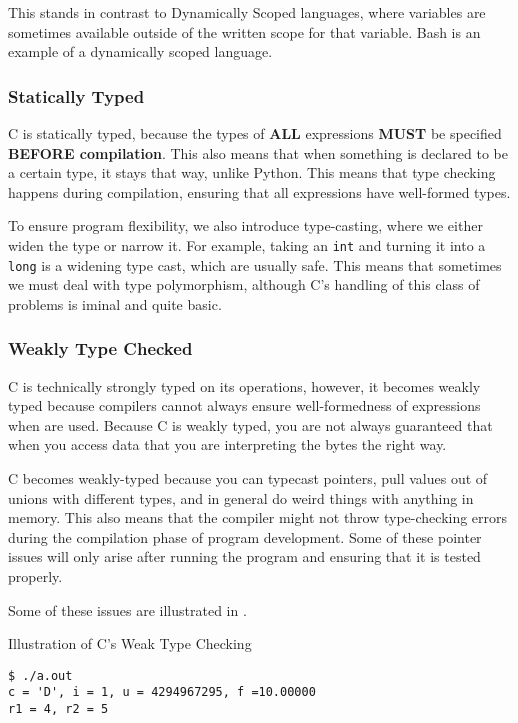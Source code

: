 This stands in contrast to Dynamically Scoped languages, where variables are sometimes available outside of the written scope for that variable.
Bash is an example of a dynamically scoped language.

\subsubsection{Statically Typed}\label{subsubsec:Statically_Typed}
C is statically typed, because the types of \textbf{ALL} expressions \textbf{MUST} be specified \textbf{BEFORE compilation}.
This also means that when something is declared to be a certain type, it stays that way, unlike Python.
This means that type checking happens during compilation, ensuring that all expressions have well-formed types.

To ensure program flexibility, we also introduce type-casting, where we either widen the type or narrow it.
For example, taking an \texttt{int} and turning it into a \texttt{long} is a widening type cast, which are usually safe.
This means that sometimes we must deal with type polymorphism, although C's handling of this class of problems is iminal and quite basic.

\subsubsection{Weakly Type Checked}\label{subsubsec:Weakly_Type_Checked}
C is technically strongly typed on its operations, however, it becomes weakly typed because compilers cannot always ensure well-formedness of expressions when  are used.
Because C is weakly typed, you are not always guaranteed that when you access data that you are interpreting the bytes the right way.

C becomes weakly-typed because you can typecast pointers, pull values out of unions with different types, and in general do weird things with anything in memory.
This also means that the compiler might not throw type-checking errors during the compilation phase of program development.
Some of these pointer issues will only arise after running the program and ensuring that it is tested properly.

Some of these issues are illustrated in .
\begin{listing}[h!tbp]
\caption{Illustration of C's Weak Type Checking}
\label{lst:Weak_Type_Checking}
\begin{verbatim}
$ ./a.out
c = 'D', i = 1, u = 4294967295, f =10.00000
r1 = 4, r2 = 5
\end{verbatim}
\end{listing}


